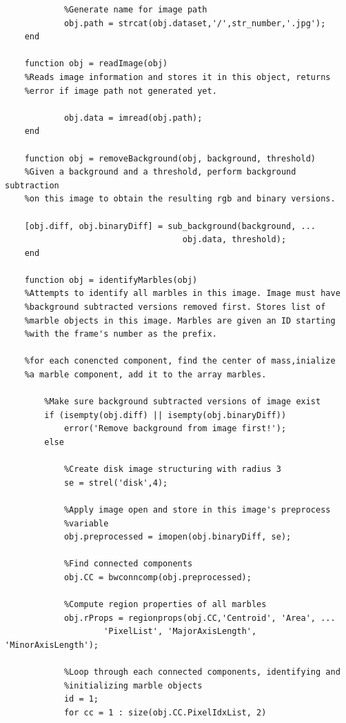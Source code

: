 \documentclass[10pt,a4paper,onecolumn]{report}
\begin{document}
\begin{lstlisting}
            %Generate name for image path
            obj.path = strcat(obj.dataset,'/',str_number,'.jpg');
    end

    function obj = readImage(obj)
    %Reads image information and stores it in this object, returns
    %error if image path not generated yet.

            obj.data = imread(obj.path);
    end

    function obj = removeBackground(obj, background, threshold)
    %Given a background and a threshold, perform background subtraction
    %on this image to obtain the resulting rgb and binary versions.

    [obj.diff, obj.binaryDiff] = sub_background(background, ...
                                    obj.data, threshold);
    end

    function obj = identifyMarbles(obj)
    %Attempts to identify all marbles in this image. Image must have
    %background subtracted versions removed first. Stores list of
    %marble objects in this image. Marbles are given an ID starting
    %with the frame's number as the prefix.

    %for each conencted component, find the center of mass,inialize
    %a marble component, add it to the array marbles.

        %Make sure background subtracted versions of image exist
        if (isempty(obj.diff) || isempty(obj.binaryDiff))
            error('Remove background from image first!');
        else

            %Create disk image structuring with radius 3
            se = strel('disk',4);

            %Apply image open and store in this image's preprocess 
            %variable
            obj.preprocessed = imopen(obj.binaryDiff, se);

            %Find connected components
            obj.CC = bwconncomp(obj.preprocessed);

            %Compute region properties of all marbles
            obj.rProps = regionprops(obj.CC,'Centroid', 'Area', ...
                    'PixelList', 'MajorAxisLength', 'MinorAxisLength');

            %Loop through each connected components, identifying and
            %initializing marble objects
            id = 1; 
            for cc = 1 : size(obj.CC.PixelIdxList, 2)


\end{lstlisting}
\end{document}

